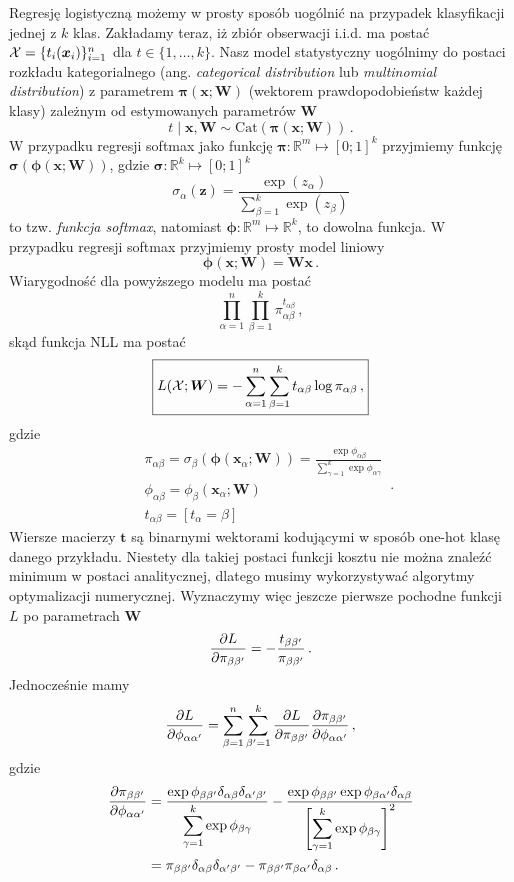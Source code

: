 \documentclass{myclass}
\begin{document}
Regresję logistyczną możemy w prosty sposób uogólnić na przypadek klasyfikacji jednej z \(k\) klas.
Zakładamy teraz, iż zbiór obserwacji i.i.d. ma postać \(\mathcal{X} = \{t_i(\bm{x}_i)\}_{i=1}^n\) dla \(t
\in \{1,\ldots,k\}\). Nasz model statystyczny uogólnimy do postaci rozkładu kategorialnego (ang.
\emph{categorical distribution} lub \emph{multinomial distribution}) z parametrem \(\bm{\pi}(\bm{x};
\bm{W})\) (wektorem prawdopodobieństw każdej klasy) zależnym od estymowanych parametrów \(\bm{W}\)
\[
t \mid \bm{x}, \bm{W} \sim \mathrm{Cat}(\bm{\pi}(\bm{x}; \bm{W}))\,.
\]
W przypadku regresji softmax jako funkcję \(\bm{\pi}: \mathbb{R}^m \mapsto [0;1]^k\) przyjmiemy
funkcję \(\bm{\sigma}(\bm{\phi}(\bm{x}; \bm{W}))\), gdzie \(\bm{\sigma}: \mathbb{R}^k \mapsto
[0;1]^k\)
\[
\sigma_\alpha(\bm{z}) = \frac{\exp(z_\alpha)}{ \sum_{\beta=1}^k \exp(z_\beta)}
\]
to tzw. \emph{funkcja softmax}, natomiast \(\bm{\phi}: \mathbb{R}^m \mapsto \mathbb{R}^k\), to
dowolna funkcja. W przypadku regresji softmax przyjmiemy prosty model liniowy
\[
\bm{\phi}(\bm{x}; \bm{W}) = \bm{W}\bm{x}\,.
\]
Wiarygodność dla powyższego modelu ma postać
\[
\prod_{\alpha=1}^n \prod_{\beta=1}^k \pi_{\alpha\beta}^{t_{\alpha\beta}}\,,
\]
skąd funkcja NLL ma postać
\[
\boxed{
L(\mathcal{X}; \bm{W}) = - \sum_{\alpha=1}^n \sum_{\beta=1}^k t_{\alpha\beta} \log \pi_{\alpha\beta}\,,
}
\]
gdzie
\[
\begin{split}
    &\pi_{\alpha\beta} = \sigma_\beta(\bm{\phi}(\bm{x}_\alpha; \bm{W})) = \frac{\exp \phi_{\alpha\beta}}{\displaystyle \sum_{\gamma=1}^k \exp \phi_{\alpha\gamma}}\\
    &\phi_{\alpha\beta} = \phi_{\beta}(\bm{x}_\alpha; \bm{W}) \\
    &t_{\alpha\beta} = [t_\alpha = \beta]
\end{split}\,.
\]
Wiersze macierzy \(\bm{t}\) są binarnymi wektorami kodującymi w sposób one-hot klasę danego
przykładu. Niestety dla takiej postaci funkcji kosztu nie można znaleźć minimum w postaci
analitycznej, dlatego musimy wykorzystywać algorytmy optymalizacji numerycznej. Wyznaczymy więc
jeszcze pierwsze pochodne funkcji \(L\) po parametrach \(\bm{W}\)
\[
    \pdv{L}{\pi_{\beta\beta'}} = - \frac{t_{\beta\beta'}}{\pi_{\beta\beta'}}\,.
\]
Jednocześnie mamy
\[
    \pdv{L}{\phi_{\alpha\alpha'}} = \sum_{\beta=1}^n \sum_{\beta'=1}^k \pdv{L}{\pi_{\beta\beta'}} \pdv{\pi_{\beta\beta'}}{\phi_{\alpha\alpha'}}\,,
\]
gdzie
\[
\begin{split}
    \pdv{\pi_{\beta\beta'}}{\phi_{\alpha\alpha'}} &= \frac{\exp \phi_{\beta\beta'} \delta_{\alpha\beta} \delta_{\alpha'\beta'} }{ \displaystyle \sum_{\gamma=1}^k \exp \phi_{\beta\gamma}} - \frac{\exp \phi_{\beta\beta'} \exp \phi_{\beta\alpha'} \delta_{\alpha\beta}}{\displaystyle \left[ \sum_{\gamma=1}^k \exp \phi_{\beta\gamma} \right]^2} \\
           &= \pi_{\beta\beta'} \delta_{\alpha\beta} \delta_{\alpha'\beta'} - \pi_{\beta\beta'} \pi_{\beta\alpha'} \delta_{\alpha\beta}\,.
\end{split}
\]
\end{document}
